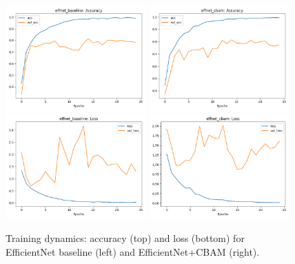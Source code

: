 \begin{figure}[t]
  \centering
  \includegraphics[width=0.48\textwidth]{../new_work/figures/effnet_baseline_acc.png}
  \includegraphics[width=0.48\textwidth]{../new_work/figures/effnet_cbam_acc.png}\\
  \includegraphics[width=0.48\textwidth]{../new_work/figures/effnet_baseline_loss.png}
  \includegraphics[width=0.48\textwidth]{../new_work/figures/effnet_cbam_loss.png}
  \caption{Training dynamics: accuracy (top) and loss (bottom) for EfficientNet baseline (left) and EfficientNet+CBAM (right).}
  \label{fig:train_curves}
\end{figure}

